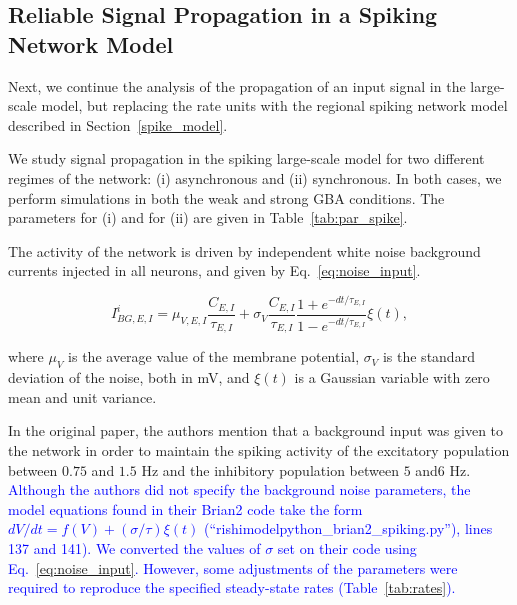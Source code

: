 \subsection{Reliable Signal Propagation in a Spiking Network Model}\label{gba_spk}

Next, we continue the analysis of the propagation of an input signal in the large-scale model, but replacing the rate units with the regional spiking network model described in Section~\ref{spike_model}.

We study signal propagation in the spiking large-scale model for two different regimes of the network: (i) asynchronous and (ii) synchronous. In both cases, we perform simulations in both the weak and strong GBA conditions. The parameters for (i) and for (ii) are given in Table~\ref{tab:par_spike}.

The activity of the network is driven by independent white noise background currents injected in all neurons, and given by Eq.~\ref{eq:noise_input}.

\begin{equation}
    I_{BG,E,I}^{i} = \mu_{V,E,I}\frac{C_{E,I}}{\tau_{E,I}} + \sigma_{V} \frac{C_{ E,I}}{\tau_{E,I}}\frac{1+e^{-dt/\tau_{E,I}}}{1-e^{-dt/\tau_{E,I}}}\xi(t),
    \label{eq:noise_input}
\end{equation}

\noindent where $\mu_{V}$ is the average value of the membrane potential, $\sigma_{V}$ is the standard deviation of the noise, both in mV, and $\xi(t)$ is a Gaussian variable with zero mean and unit variance. 

In the original paper, the authors mention that a background input was given to the network in order to maintain the spiking activity of the excitatory population between $0.75$ and $1.5$ Hz and the inhibitory population between $5$ and$6$ Hz. \textcolor{blue}{Although the authors did not specify the background noise parameters, the model equations found in their Brian2 code take the form $dV/dt = f(V) + (\sigma/\tau)\xi(t)$ (``rishimodelpython\_brian2\_spiking.py''), lines 137 and 141). We converted the values of $\sigma$ set on their code using Eq.~\ref{eq:noise_input}. However, some adjustments of the parameters were required to reproduce the specified steady-state rates (Table~\ref{tab:rates}).}


